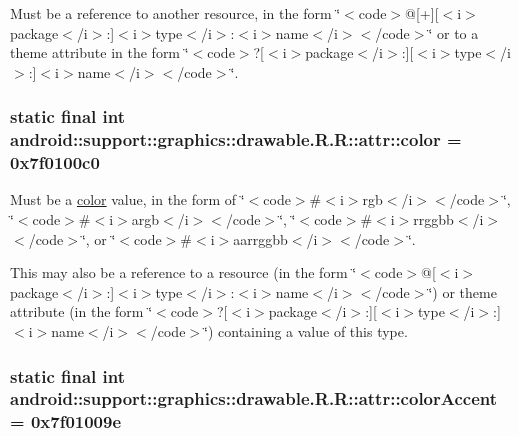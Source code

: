 Must be a reference to another resource, in the form \char`\"{}$<$code$>$@\mbox{[}+\mbox{]}\mbox{[}$<$i$>$package$<$/i$>$:\mbox{]}$<$i$>$type$<$/i$>$:$<$i$>$name$<$/i$>$$<$/code$>$\char`\"{} or to a theme attribute in the form \char`\"{}$<$code$>$?\mbox{[}$<$i$>$package$<$/i$>$:\mbox{]}\mbox{[}$<$i$>$type$<$/i$>$:\mbox{]}$<$i$>$name$<$/i$>$$<$/code$>$\char`\"{}. \hypertarget{classandroid_1_1support_1_1graphics_1_1drawable_1_1_r_1_1attr_03f87debdfd794f7a7b906afda7614a1}{
\subsubsection[{color}]{\setlength{\rightskip}{0pt plus 5cm}static final int android::support::graphics::drawable.R.R::attr::color = 0x7f0100c0}}
\label{classandroid_1_1support_1_1graphics_1_1drawable_1_1_r_1_1attr_03f87debdfd794f7a7b906afda7614a1}


Must be a \hyperlink{classandroid_1_1support_1_1graphics_1_1drawable_1_1_r_1_1color}{color} value, in the form of \char`\"{}$<$code$>$\#$<$i$>$rgb$<$/i$>$$<$/code$>$\char`\"{}, \char`\"{}$<$code$>$\#$<$i$>$argb$<$/i$>$$<$/code$>$\char`\"{}, \char`\"{}$<$code$>$\#$<$i$>$rrggbb$<$/i$>$$<$/code$>$\char`\"{}, or \char`\"{}$<$code$>$\#$<$i$>$aarrggbb$<$/i$>$$<$/code$>$\char`\"{}. 

This may also be a reference to a resource (in the form \char`\"{}$<$code$>$@\mbox{[}$<$i$>$package$<$/i$>$:\mbox{]}$<$i$>$type$<$/i$>$:$<$i$>$name$<$/i$>$$<$/code$>$\char`\"{}) or theme attribute (in the form \char`\"{}$<$code$>$?\mbox{[}$<$i$>$package$<$/i$>$:\mbox{]}\mbox{[}$<$i$>$type$<$/i$>$:\mbox{]}$<$i$>$name$<$/i$>$$<$/code$>$\char`\"{}) containing a value of this type. \hypertarget{classandroid_1_1support_1_1graphics_1_1drawable_1_1_r_1_1attr_c8abb6c6b54aa9c1410a312291f7aa24}{
\subsubsection[{colorAccent}]{\setlength{\rightskip}{0pt plus 5cm}static final int android::support::graphics::drawable.R.R::attr::colorAccent = 0x7f01009e}}
\label{classandroid_1_1support_1_1graphics_1_1drawable_1_1_r_1_1attr_c8abb6c6b54aa9c1410a312291f7aa24}


